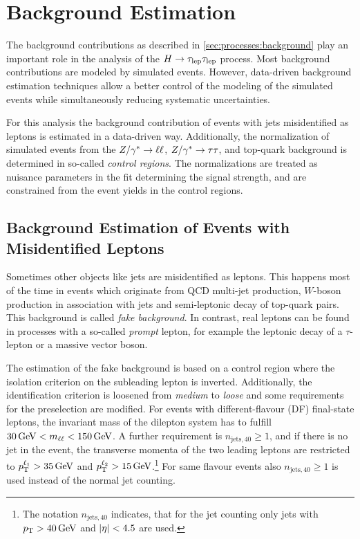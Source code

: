 \chapter{Background Estimation}\label{cha:background_estimation}

The background contributions as described in \cref{sec:processes:background} play an important role
in the analysis of the $H \to \tau_\text{lep} \tau_\text{lep}$ process.
Most background contributions are modeled by simulated events.
However, data-driven background estimation techniques allow a better control of the modeling of the simulated
events while simultaneously reducing systematic uncertainties.

For this analysis the background contribution of events with jets misidentified as leptons is estimated in a data-driven way.
Additionally, the normalization of simulated events from the $Z / \gamma^* \to \ell \ell$, $Z / \gamma^* \to \tau \tau$, and top-quark background is determined
in so-called \emph{control regions}.
The normalizations are treated as nuisance parameters in the fit determining  the signal strength, and are constrained from the event yields in the control regions.

\section{Background Estimation of Events with Misidentified Leptons}\label{sec:background_estimation:fakes}

Sometimes other objects like jets are misidentified as leptons.
This happens most of the time in events which originate from QCD multi-jet production, $W$-boson production in association with jets
and semi-leptonic decay of top-quark pairs.
This background is called \emph{fake background}.
In contrast, real leptons can be found in processes with a so-called \emph{prompt} lepton, for example the leptonic decay of
a $\tau$-lepton or a massive vector boson.

The estimation of the fake background is based on a control region where the isolation criterion on the subleading lepton
is inverted.
Additionally, the identification criterion is loosened from \emph{medium} to \emph{loose} and some requirements for the preselection are modified.
For events with different-flavour (DF) final-state leptons, the invariant mass of the dilepton system has to fulfill $\SI{30}{\GeV} < \mll < \SI{150}{\GeV}$.
A further requirement is $n_{\text{jets},40} \geq 1$, and if there is no jet in the event, the
transverse momenta of the two leading leptons are restricted to $\pt^{\ell_1} > \SI{35}{\GeV}$ and
$\pt^{\ell_2} > \SI{15}{\GeV}$.\footnote{The notation $n_{\text{jets},40}$ indicates, that for the jet counting only jets with $\pt > \SI{40}{\GeV}$ and $\left|\eta\right| < 4.5$ are used.}
For same flavour events also $n_{\text{jets},40} \geq 1$ is used instead of the normal jet counting.

